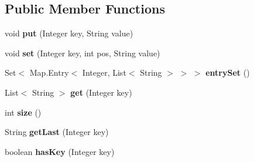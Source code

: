 \subsection*{Public Member Functions}
\begin{DoxyCompactItemize}
\item 
void {\bfseries put} (Integer key, String value)\hypertarget{classcom_1_1example_1_1sebastian_1_1tindertp_1_1commonTools_1_1MultiHashIntStr_a3f9a40ad21eb488d449b08800659950c}{}\label{classcom_1_1example_1_1sebastian_1_1tindertp_1_1commonTools_1_1MultiHashIntStr_a3f9a40ad21eb488d449b08800659950c}

\item 
void {\bfseries set} (Integer key, int pos, String value)\hypertarget{classcom_1_1example_1_1sebastian_1_1tindertp_1_1commonTools_1_1MultiHashIntStr_ab661de04f00761f8e217f5ae84ebfa93}{}\label{classcom_1_1example_1_1sebastian_1_1tindertp_1_1commonTools_1_1MultiHashIntStr_ab661de04f00761f8e217f5ae84ebfa93}

\item 
Set$<$ Map.\+Entry$<$ Integer, List$<$ String $>$ $>$ $>$ {\bfseries entry\+Set} ()\hypertarget{classcom_1_1example_1_1sebastian_1_1tindertp_1_1commonTools_1_1MultiHashIntStr_a939a160e73c7e6ed7e9acfbb94fcac6c}{}\label{classcom_1_1example_1_1sebastian_1_1tindertp_1_1commonTools_1_1MultiHashIntStr_a939a160e73c7e6ed7e9acfbb94fcac6c}

\item 
List$<$ String $>$ {\bfseries get} (Integer key)\hypertarget{classcom_1_1example_1_1sebastian_1_1tindertp_1_1commonTools_1_1MultiHashIntStr_a8d53e60bd3835ab38cda809b172cf16b}{}\label{classcom_1_1example_1_1sebastian_1_1tindertp_1_1commonTools_1_1MultiHashIntStr_a8d53e60bd3835ab38cda809b172cf16b}

\item 
int {\bfseries size} ()\hypertarget{classcom_1_1example_1_1sebastian_1_1tindertp_1_1commonTools_1_1MultiHashIntStr_ae5ee0687db9607bec61a20f2cf2a96de}{}\label{classcom_1_1example_1_1sebastian_1_1tindertp_1_1commonTools_1_1MultiHashIntStr_ae5ee0687db9607bec61a20f2cf2a96de}

\item 
String {\bfseries get\+Last} (Integer key)\hypertarget{classcom_1_1example_1_1sebastian_1_1tindertp_1_1commonTools_1_1MultiHashIntStr_a94805e2193e436a8df5ff63a2c7e640b}{}\label{classcom_1_1example_1_1sebastian_1_1tindertp_1_1commonTools_1_1MultiHashIntStr_a94805e2193e436a8df5ff63a2c7e640b}

\item 
boolean {\bfseries has\+Key} (Integer key)\hypertarget{classcom_1_1example_1_1sebastian_1_1tindertp_1_1commonTools_1_1MultiHashIntStr_a983dfd9a7fb71ddc2c8ba5fb54650f38}{}\label{classcom_1_1example_1_1sebastian_1_1tindertp_1_1commonTools_1_1MultiHashIntStr_a983dfd9a7fb71ddc2c8ba5fb54650f38}

\end{DoxyCompactItemize}
